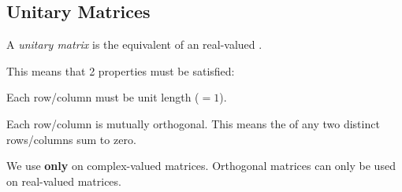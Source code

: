 \subsection{Unitary Matrices}\label{subsec:Unitary_Matrices}
\begin{definition}\label{def:Unitary_Matrix}
  A \emph{unitary matrix} is the  equivalent of an  real-valued .

  This means that 2 properties must be satisfied:
  \begin{propertylist}
  \item Each row/column must be unit length ($=1$).\label{prop:Unitary_Matrix-Unit_Length}
  \item Each row/column is mutually orthogonal.
    This means the  of any two distinct rows/columns sum to zero.\label{prop:Unitary_Matrix-Mutually_Orthogonal}
  \end{propertylist}
\end{definition}

\begin{remark*}
  We use  \textbf{only} on complex-valued matrices.
  Orthogonal matrices can only be used on real-valued matrices.
\end{remark*}

